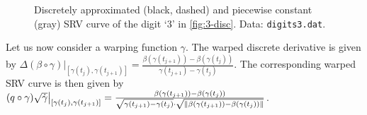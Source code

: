 \begin{figure}
  \centering
  \begin{subfigure}{.48\textwidth}
    \centering
  \end{subfigure}\hfill%
  \begin{subfigure}{.48\textwidth}
    \centering
    \begin{subfigure}{\textwidth}
      \centering
    \end{subfigure}
    \begin{subfigure}{\textwidth}
      \centering
    \end{subfigure}
  \end{subfigure}
  \caption{Discretely approximated (black, dashed) and piecewise constant (gray) SRV curve of the digit \enquote*{3} in \cref{fig:3-disc}. Data: \texttt{digits3.dat}.}
  \label{fig:3-disc-srv}
\end{figure}

Let us now consider a warping function $\gamma$.
The warped discrete derivative is given by $\Delta (\beta \circ \gamma) \big\rvert_{[\gamma(t_j), \gamma(t_{j+1})]} = \frac{\beta(\gamma(t_{j+1})) - \beta(\gamma(t_{j}))}{\gamma(t_{j+1}) - \gamma(t_j)}$.
The corresponding warped SRV curve is then given by  $(q \circ \gamma) \sqrt{\dot\gamma} \big\rvert_{[\gamma(t_j), \gamma(t_{j+1})]} = \frac{\beta(\gamma(t_{j+1})) - \beta(\gamma(t_j))}{\sqrt{\gamma(t_{j+1}) - \gamma(t_j)} \cdot \sqrt{\lVert\beta(\gamma(t_{j+1})) - \beta(\gamma(t_j))\rVert}}$.



